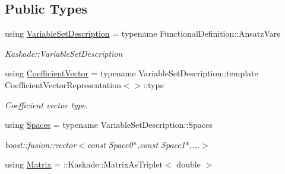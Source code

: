 \subsection*{Public Types}
\begin{DoxyCompactItemize}
\item 
\hypertarget{classSpacy_1_1KaskadeParabolic_1_1OCP_1_1DirectBlockPreconditioner_a7b268f830d36a01c2390b98c9fd03b4a}{using \hyperlink{classSpacy_1_1KaskadeParabolic_1_1OCP_1_1DirectBlockPreconditioner_a7b268f830d36a01c2390b98c9fd03b4a}{Variable\-Set\-Description} = typename Functional\-Definition\-::\-Ansatz\-Vars}\label{classSpacy_1_1KaskadeParabolic_1_1OCP_1_1DirectBlockPreconditioner_a7b268f830d36a01c2390b98c9fd03b4a}

\begin{DoxyCompactList}\small\item\em Kaskade\-::\-Variable\-Set\-Description \end{DoxyCompactList}\item 
\hypertarget{classSpacy_1_1KaskadeParabolic_1_1OCP_1_1DirectBlockPreconditioner_a9fa8e87d8421acc9a52472322d76bde8}{using \hyperlink{classSpacy_1_1KaskadeParabolic_1_1OCP_1_1DirectBlockPreconditioner_a9fa8e87d8421acc9a52472322d76bde8}{Coefficient\-Vector} = typename Variable\-Set\-Description\-::template Coefficient\-Vector\-Representation$<$$>$\-::type}\label{classSpacy_1_1KaskadeParabolic_1_1OCP_1_1DirectBlockPreconditioner_a9fa8e87d8421acc9a52472322d76bde8}

\begin{DoxyCompactList}\small\item\em Coefficient vector type. \end{DoxyCompactList}\item 
\hypertarget{classSpacy_1_1KaskadeParabolic_1_1OCP_1_1DirectBlockPreconditioner_a2d88e1bb12a0638a7640d0bd8d8177a9}{using \hyperlink{classSpacy_1_1KaskadeParabolic_1_1OCP_1_1DirectBlockPreconditioner_a2d88e1bb12a0638a7640d0bd8d8177a9}{Spaces} = typename Variable\-Set\-Description\-::\-Spaces}\label{classSpacy_1_1KaskadeParabolic_1_1OCP_1_1DirectBlockPreconditioner_a2d88e1bb12a0638a7640d0bd8d8177a9}

\begin{DoxyCompactList}\small\item\em boost\-::fusion\-::vector$<$const Space0$\ast$,const Space1$\ast$,...$>$ \end{DoxyCompactList}\item 
\hypertarget{classSpacy_1_1KaskadeParabolic_1_1OCP_1_1DirectBlockPreconditioner_a73578f2e6a968974f7188d15b66aefcf}{using \hyperlink{classSpacy_1_1KaskadeParabolic_1_1OCP_1_1DirectBlockPreconditioner_a73578f2e6a968974f7188d15b66aefcf}{Matrix} = \-::Kaskade\-::\-Matrix\-As\-Triplet$<$ double $>$}\label{classSpacy_1_1KaskadeParabolic_1_1OCP_1_1DirectBlockPreconditioner_a73578f2e6a968974f7188d15b66aefcf}


\end{DoxyCompactItemize}
